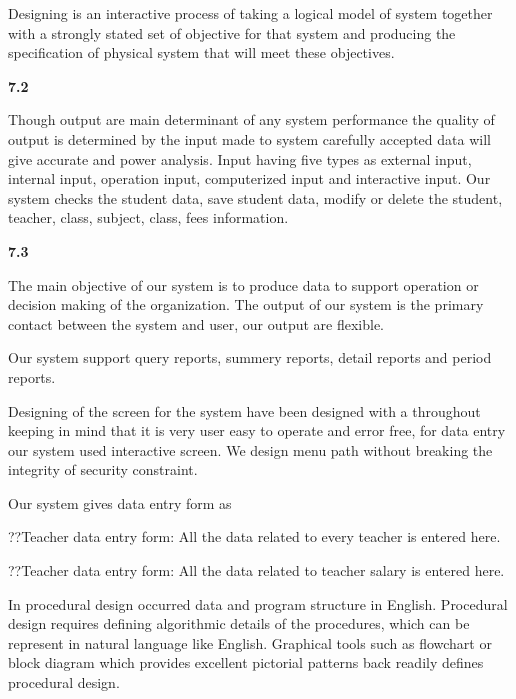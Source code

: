 \documentclass{article} %
\begin{document}
\noindent Designing is an interactive process of taking a logical model of system together with a strongly stated set of objective for that system and producing the specification of physical system that will meet these objectives.

\noindent \textbf{7.2  }

\noindent 

\noindent         Though output are main determinant of any system performance the quality of output is determined by the input made to system carefully accepted data will give accurate and power analysis. Input having five types as external input, internal input, operation input, computerized input and interactive input. Our system checks the student data, save student data, modify or delete the student, teacher, class, subject, class, fees information. 

\noindent \textbf{7.3 }

\noindent 

\noindent          The main objective of our system is to produce data to support operation or decision making of the organization. The output of our system is the primary contact between the system and user, our output are flexible. 

\noindent        Our system support query reports, summery reports, detail reports and period reports.

\noindent 

\noindent \textbf{}

\noindent 

\noindent Designing of the screen for the system have been designed with a throughout keeping in mind that it is very user easy to operate and error free, for data entry our system used interactive screen. We design menu path without breaking the integrity of security constraint. 

\noindent      Our system gives data entry form as 

\noindent ??Teacher data entry form: All the data related to every teacher is entered here. 

\noindent ??Teacher data entry form: All the data related to teacher salary is entered here. 

\noindent 

\noindent \textbf{}

\noindent \underbar{}

\noindent In procedural design occurred data and program structure in English. Procedural design requires defining algorithmic details of the procedures, which can be represent in natural language like English. Graphical tools such as flowchart or block diagram which provides excellent pictorial patterns back readily defines procedural design. 
\end{document}
